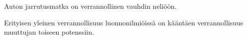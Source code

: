 
\begin{esimerkki}
Auton jarrutusmatka on verrannollinen vauhdin neliöön.
\end{esimerkki}

Erityisen yleinen verrannollisuus luonnonilmiöissä on kääntäen verrannollisuus muuttujan toiseen potenssiin. %
%
%




